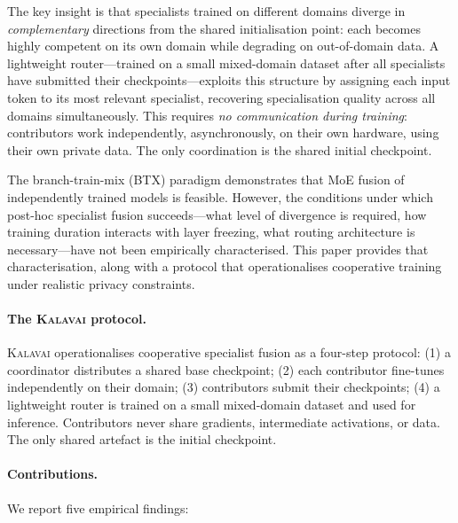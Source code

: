 \documentclass{article}
\newcommand{\kalavai}{\textsc{Kalavai}\xspace}
\begin{document}
The key insight is that specialists trained on different domains diverge in \emph{complementary} directions from the shared initialisation point: each becomes highly competent on its own domain while degrading on out-of-domain data. A lightweight router---trained on a small mixed-domain dataset after all specialists have submitted their checkpoints---exploits this structure by assigning each input token to its most relevant specialist, recovering specialisation quality across all domains simultaneously. This requires \emph{no communication during training}: contributors work independently, asynchronously, on their own hardware, using their own private data. The only coordination is the shared initial checkpoint.

The branch-train-mix (BTX) paradigm \citep{sukhbaatar2024branchtrainmix} demonstrates that MoE fusion of independently trained models is feasible. However, the conditions under which post-hoc specialist fusion succeeds---what level of divergence is required, how training duration interacts with layer freezing, what routing architecture is necessary---have not been empirically characterised. This paper provides that characterisation, along with a protocol that operationalises cooperative training under realistic privacy constraints.

\paragraph{The \kalavai protocol.} \kalavai operationalises cooperative specialist fusion as a four-step protocol: (1) a coordinator distributes a shared base checkpoint; (2) each contributor fine-tunes independently on their domain; (3) contributors submit their checkpoints; (4) a lightweight router is trained on a small mixed-domain dataset and used for inference. Contributors never share gradients, intermediate activations, or data. The only shared artefact is the initial checkpoint.

\paragraph{Contributions.} We report five empirical findings:
\end{document}
